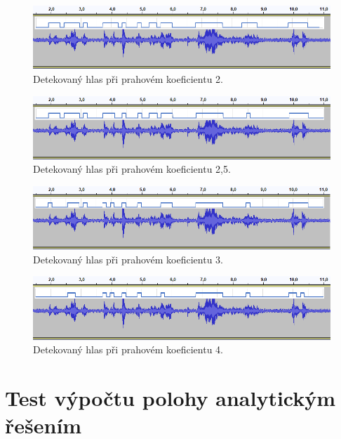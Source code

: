 \begin{figure}[ht]
	\centering
	\includegraphics[width=1\textwidth]{obrazky-figures/energy2.png}
	\caption{Detekovaný hlas při prahovém koeficientu 2.}
\end{figure}

\begin{figure}[ht]
	\centering
	\includegraphics[width=1\textwidth]{obrazky-figures/energy25.png}
	\caption{Detekovaný hlas při prahovém koeficientu 2,5.}
\end{figure}

\begin{figure}[!ht]
	\centering
	\includegraphics[width=1\textwidth]{obrazky-figures/energy3.png}
	\caption{Detekovaný hlas při prahovém koeficientu 3.}
	\label{pic:ene3}
\end{figure}

\begin{figure}[!ht]
	\centering
	\includegraphics[width=1\textwidth]{obrazky-figures/energy4.png}
	\caption{Detekovaný hlas při prahovém koeficientu 4.}
\end{figure}
\newpage
\section{Test výpočtu polohy analytickým řešením}

